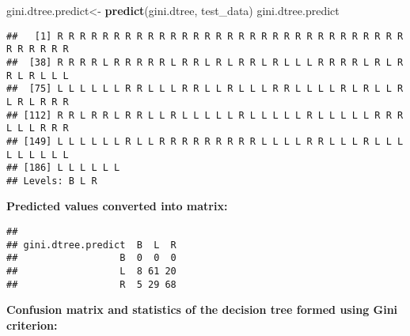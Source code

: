 \documentclass[
]{article}
\newenvironment{Shaded}{\begin{snugshade}}{\end{snugshade}}
\newcommand{\KeywordTok}[1]{\textcolor[rgb]{0.13,0.29,0.53}{\textbf{#1}}}
\newcommand{\NormalTok}[1]{#1}
\newcommand{\OperatorTok}[1]{\textcolor[rgb]{0.81,0.36,0.00}{\textbf{#1}}}
\newcommand{\StringTok}[1]{\textcolor[rgb]{0.31,0.60,0.02}{#1}}
\begin{document}
\begin{Shaded}
\begin{Highlighting}[]
\NormalTok{gini.dtree.predict<-}\StringTok{ }\KeywordTok{predict}\NormalTok{(gini.dtree, test_data)}
\NormalTok{gini.dtree.predict}
\end{Highlighting}
\end{Shaded}

\begin{verbatim}
##   [1] R R R R R R R R R R R R R R R R R R R R R R R R R R R R R R R R R R R R R
##  [38] R R R R L R R R R R L R R L R L R R L R L L L R R R R L R L R R L R L L L
##  [75] L L L L L L R R L L L R R L L R L L L R R L L L L R L R L L R L R L R R R
## [112] R R L R R L R R L L R L L L L L R L L L L L R L L L L L R R R L L L R R R
## [149] L L L L L L R L L R R R R R R R R R L L L L R R L L L R L L L L L L L L L
## [186] L L L L L L
## Levels: B L R
\end{verbatim}

\textbf{Predicted values converted into matrix:}

\begin{Shaded}
\end{Shaded}

\begin{verbatim}
##                   
## gini.dtree.predict  B  L  R
##                  B  0  0  0
##                  L  8 61 20
##                  R  5 29 68
\end{verbatim}

\textbf{Confusion matrix and statistics of the decision tree formed
using Gini criterion:}

\begin{Shaded}
\end{Shaded}
\end{document}
